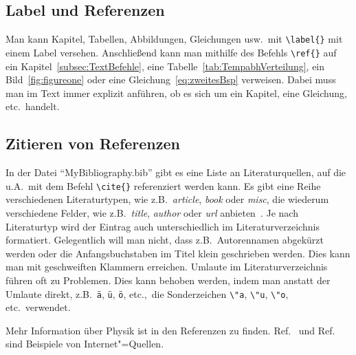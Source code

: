 \subsection{Label und Referenzen}
\label{subsec:labelref}
Man kann Kapitel, Tabellen, Abbildungen, Gleichungen usw.\ mit \verb"\label{}" mit einem Label versehen. Anschließend kann man mithilfe des Befehls \verb"\ref{}" auf ein Kapitel~\ref{subsec:TextBefehle}, eine Tabelle~\ref{tab:TempabhVerteilung}, ein Bild~\ref{fig:figureone} oder eine Gleichung~\ref{eq:zweitesBsp} verweisen. Dabei muss man im Text immer explizit anführen, ob es sich um ein Kapitel, eine Gleichung, etc.\ handelt. %
%
\subsection{Zitieren von Referenzen}
\label{subsec:ZitRef}
In der Datei "`MyBibliography.bib"' gibt es eine Liste an Literaturquellen, auf die u.A.\ mit dem Befehl \verb"\cite{}" referenziert werden kann. Es gibt eine Reihe verschiedenen Literaturtypen, wie z.B.\ \textit{article}, \textit{book} oder \textit{misc}, die wiederum verschiedene Felder, wie z.B.\ \textit{title}, \textit{author} oder \textit{url} anbieten~\cite{biblatexManual}. Je nach Literaturtyp wird der Eintrag auch unterschiedlich im Literaturverzeichnis formatiert. Gelegentlich will man nicht, dass z.B.\ Autorennamen abgekürzt werden oder die Anfangsbuchstaben im Titel klein geschrieben werden. Dies kann man mit geschweiften Klammern erreichen. Umlaute im Literaturverzeichnis führen oft zu Problemen. Dies kann behoben werden, indem man anstatt der Umlaute direkt, z.B.\ \verb+ä+, \verb+ü+, \verb+ö+, etc.,\ die Sonderzeichen \verb+\"a+, \verb+\"u+, \verb+\"o+, etc.\ verwendet.

Mehr Information \"uber Physik ist in den Referenzen \cite{Demtroeder3,PhysRev.47.777} zu finden. Ref.~\cite{Internetquelle1} und Ref.~\cite{Internetquelle2} sind Beispiele von Internet"=Quellen.
%
